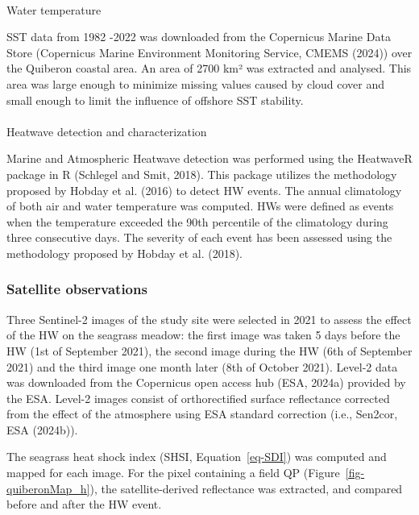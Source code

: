 \documentclass[
  letterpaper,
  11pt,
  english,
  singlespacing,
  headsepline]{MastersDoctoralThesis}
\makeatletter
\let\oldparagraph\paragraph
\renewcommand{\paragraph}{
    \@ifstar
      \xxxParagraphStar
      \xxxParagraphNoStar
  }
\newcommand{\xxxParagraphStar}[1]{\oldparagraph*{#1}\mbox{}}
\newcommand{\xxxParagraphNoStar}[1]{\oldparagraph{#1}\mbox{}}
\makeatother
\begin{document}
\begin{spacing}{1.5}
\paragraph{Water temperature}\label{water-temperature}

SST data from 1982 -2022 was downloaded from the Copernicus Marine Data
Store (Copernicus Marine Environment Monitoring Service, CMEMS (2024))
over the Quiberon coastal area. An area of 2700 km² was extracted and
analysed. This area was large enough to minimize missing values caused
by cloud cover and small enough to limit the influence of offshore SST
stability.

\paragraph{Heatwave detection and
characterization}\label{heatwave-detection-and-characterization}

Marine and Atmospheric Heatwave detection was performed using the
HeatwaveR package in R (Schlegel and Smit, 2018). This package utilizes
the methodology proposed by Hobday et al. (2016) to detect HW events.
The annual climatology of both air and water temperature was computed.
HWs were defined as events when the temperature exceeded the 90th
percentile of the climatology during three consecutive days. The
severity of each event has been assessed using the methodology proposed
by Hobday et al. (2018).

\subsubsection{Satellite observations}\label{satellite-observations}

Three Sentinel-2 images of the study site were selected in 2021 to
assess the effect of the HW on the seagrass meadow: the first image was
taken 5 days before the HW (1st of September 2021), the second image
during the HW (6th of September 2021) and the third image one month
later (8th of October 2021). Level-2 data was downloaded from the
Copernicus open access hub (ESA, 2024a) provided by the ESA. Level-2
images consist of orthorectified surface reflectance corrected from the
effect of the atmosphere using ESA standard correction (i.e., Sen2cor,
ESA (2024b)).

The seagrass heat shock index (SHSI, Equation~\ref{eq-SDI}) was computed
and mapped for each image. For the pixel containing a field QP
(Figure~\ref{fig-quiberonMap_h}), the satellite-derived reflectance was
extracted, and compared before and after the HW event.


\end{spacing}
\end{document}
